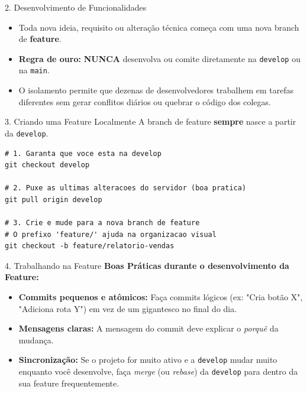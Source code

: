 \documentclass[aspectratio=169]{beamer}
\begin{document}
\begin{frame}{2. Desenvolvimento de Funcionalidades}
    \begin{itemize}
        \item Toda nova ideia, requisito ou alteração técnica começa com uma nova branch de \textbf{feature}.
        \item \textbf{Regra de ouro:} \textbf{NUNCA} desenvolva ou comite diretamente na \texttt{develop} ou na \texttt{main}.
        \item O isolamento permite que dezenas de desenvolvedores trabalhem em tarefas diferentes sem gerar conflitos diários ou quebrar o código dos colegas.
    \end{itemize}
\end{frame}

\begin{frame}[fragile]{3. Criando uma Feature Localmente}
    A branch de feature \textbf{sempre} nasce a partir da \texttt{develop}.
    \vspace{0.3cm}
\begin{lstlisting}
# 1. Garanta que voce esta na develop
git checkout develop

# 2. Puxe as ultimas alteracoes do servidor (boa pratica)
git pull origin develop

# 3. Crie e mude para a nova branch de feature
# O prefixo 'feature/' ajuda na organizacao visual
git checkout -b feature/relatorio-vendas
\end{lstlisting}
\end{frame}

\begin{frame}{4. Trabalhando na Feature}
    \textbf{Boas Práticas durante o desenvolvimento da Feature:}
    \vspace{0.2cm}
    \begin{itemize}
        \item \textbf{Commits pequenos e atômicos:} Faça commits lógicos (ex: "Cria botão X", "Adiciona rota Y") em vez de um gigantesco no final do dia.
        \item \textbf{Mensagens claras:} A mensagem do commit deve explicar o \textit{porquê} da mudança.
        \item \textbf{Sincronização:} Se o projeto for muito ativo e a \texttt{develop} mudar muito enquanto você desenvolve, faça \textit{merge} (ou \textit{rebase}) da \texttt{develop} para dentro da sua feature frequentemente.
    \end{itemize}
\end{frame}
\end{document}
